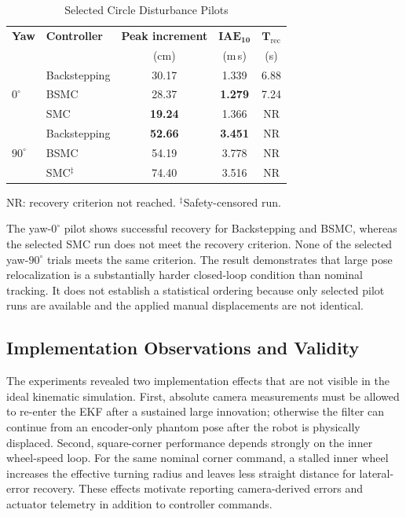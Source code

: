 \begin{table}[!t]
  \centering
  \caption{Selected Circle Disturbance Pilots}
  \label{tab:exp_disturbance}
  \scriptsize
  \setlength{\tabcolsep}{2.4pt}
  \renewcommand{\arraystretch}{1.08}
  \begin{tabular}{llccc}
    \toprule
    \textbf{Yaw} & \textbf{Controller}
      & \textbf{Peak increment} & $\mathbf{IAE_{10}}$
      & $\mathbf{T_{\mathrm{rec}}}$\\
      & & (cm) & (m\,s) & (s)\\
    \midrule
    \multirow{3}{*}{$0^\circ$}
      & Backstepping & 30.17 & 1.339 & 6.88\\
      & BSMC         & 28.37 & \textbf{1.279} & 7.24\\
      & SMC          & \textbf{19.24} & 1.366 & NR\\
    \midrule
    \multirow{3}{*}{$90^\circ$}
      & Backstepping & \textbf{52.66} & \textbf{3.451} & NR\\
      & BSMC         & 54.19 & 3.778 & NR\\
      & SMC$^\ddagger$ & 74.40 & 3.516 & NR\\
    \bottomrule
  \end{tabular}

  \vspace{1mm}
  \raggedright
  \footnotesize NR: recovery criterion not reached. 
  $^\ddagger$Safety-censored run.
\end{table}

The yaw-$0^\circ$ pilot shows successful recovery for Backstepping and BSMC,
whereas the selected SMC run does not meet the recovery criterion. None of
the selected yaw-$90^\circ$ trials meets the same criterion. The result
demonstrates that large pose relocalization is a substantially harder
closed-loop condition than nominal tracking. It does not establish a
statistical ordering because only selected pilot runs are available and the
applied manual displacements are not identical.

\subsection{Implementation Observations and Validity}

The experiments revealed two implementation effects that are not visible in
the ideal kinematic simulation. First, absolute camera measurements must be
allowed to re-enter the EKF after a sustained large innovation; otherwise the
filter can continue from an encoder-only phantom pose after the robot is
physically displaced. Second, square-corner performance depends strongly on
the inner wheel-speed loop. For the same nominal corner command, a stalled
inner wheel increases the effective turning radius and leaves less straight
distance for lateral-error recovery. These effects motivate reporting
camera-derived errors and actuator telemetry in addition to controller
commands.

